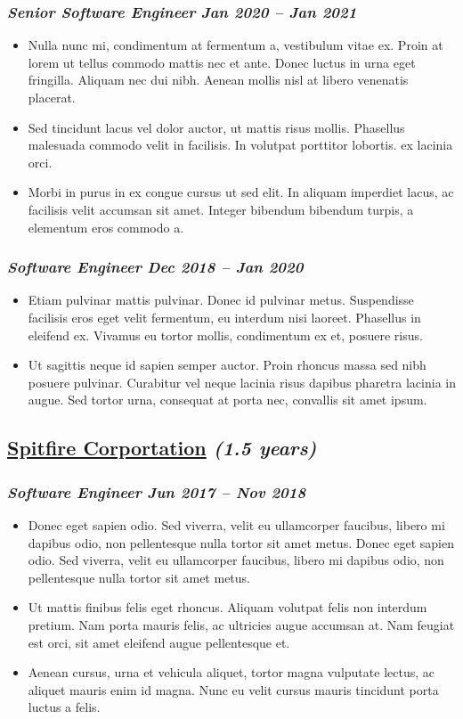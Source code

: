 \documentclass[
  16,
]{article}
\newcommand{\cvsubsection}[3]{
	\subsection{\href{#2}{#1} \hfill \textit{#3}}
}
\newcommand{\cvsubsubsection}[2]{
	\subsubsection{\textit{#1} \hfill \textit{#2}}
}
\begin{document}
\cvsubsubsection{Senior Software Engineer}{Jan 2020 -- Jan 2021}

\begin{itemize}
\item
  Nulla nunc mi, condimentum at fermentum a, vestibulum vitae ex. Proin
  at lorem ut tellus commodo mattis nec et ante. Donec luctus in urna
  eget fringilla. Aliquam nec dui nibh. Aenean mollis nisl at libero
  venenatis placerat.
\item
  Sed tincidunt lacus vel dolor auctor, ut mattis risus mollis.
  Phasellus malesuada commodo velit in facilisis. In volutpat porttitor
  lobortis. ex lacinia orci.
\item
  Morbi in purus in ex congue cursus ut sed elit. In aliquam imperdiet
  lacus, ac facilisis velit accumsan sit amet. Integer bibendum bibendum
  turpis, a elementum eros commodo a.
\end{itemize}

\cvsubsubsection{Software Engineer}{Dec 2018 -- Jan 2020}

\begin{itemize}
\item
  Etiam pulvinar mattis pulvinar. Donec id pulvinar metus. Suspendisse
  facilisis eros eget velit fermentum, eu interdum nisi laoreet.
  Phasellus in eleifend ex. Vivamus eu tortor mollis, condimentum ex et,
  posuere risus.
\item
  Ut sagittis neque id sapien semper auctor. Proin rhoncus massa sed
  nibh posuere pulvinar. Curabitur vel neque lacinia risus dapibus
  pharetra lacinia in augue. Sed tortor urna, consequat at porta nec,
  convallis sit amet ipsum.
\end{itemize}

\pagebreak

\cvsubsection{Spitfire Corportation}{https://www.spitfire.io}{(1.5 years)}
\cvsubsubsection{Software Engineer}{Jun 2017 -- Nov 2018}

\begin{itemize}
\item
  Donec eget sapien odio. Sed viverra, velit eu ullamcorper faucibus,
  libero mi dapibus odio, non pellentesque nulla tortor sit amet metus.
  Donec eget sapien odio. Sed viverra, velit eu ullamcorper faucibus,
  libero mi dapibus odio, non pellentesque nulla tortor sit amet metus.
\item
  Ut mattis finibus felis eget rhoncus. Aliquam volutpat felis non
  interdum pretium. Nam porta mauris felis, ac ultricies augue accumsan
  at. Nam feugiat est orci, sit amet eleifend augue pellentesque et.
\item
  Aenean cursus, urna et vehicula aliquet, tortor magna vulputate
  lectus, ac aliquet mauris enim id magna. Nunc eu velit cursus mauris
  tincidunt porta luctus a felis.
\end{itemize}
\end{document}
